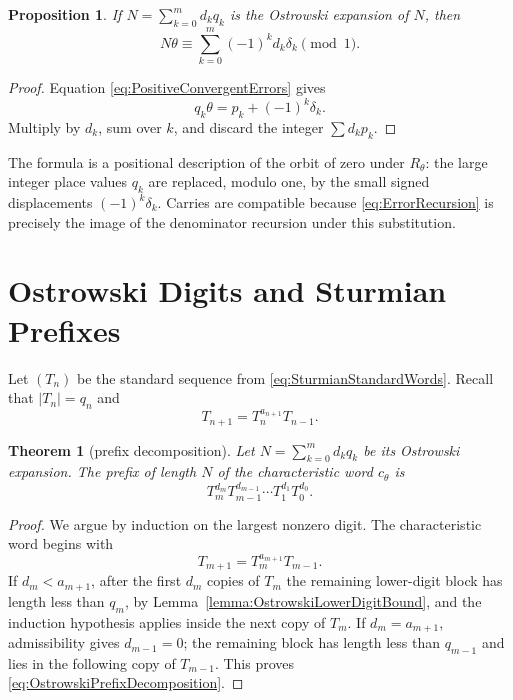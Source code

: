 \documentclass{book}
\newtheorem{proposition}[definition]{Proposition}
\newtheorem{theorem}[definition]{Theorem}
\begin{document}
\begin{proposition}\label{proposition:OstrowskiOrbitFormula}
  If \(N=\sum_{k=0}^m d_kq_k\) is the Ostrowski expansion of \(N\), then
  \begin{equation}\label{eq:OstrowskiOrbitFormula}
    N\theta
    \equiv\sum_{k=0}^m(-1)^kd_k\delta_k\pmod1.
  \end{equation}
\end{proposition}
\begin{proof}
  Equation \eqref{eq:PositiveConvergentErrors} gives
  \[
    q_k\theta=p_k+(-1)^k\delta_k.
  \]
  Multiply by \(d_k\), sum over \(k\), and discard the integer
  \(\sum d_kp_k\).
\end{proof}

The formula is a positional description of the orbit of zero under
\(R_\theta\): the large integer place values \(q_k\) are replaced, modulo
one, by the small signed displacements \((-1)^k\delta_k\).  Carries are
compatible because \eqref{eq:ErrorRecursion} is precisely the image of the
denominator recursion under this substitution.

\section{Ostrowski Digits and Sturmian Prefixes}

Let \((T_n)\) be the standard sequence from
\eqref{eq:SturmianStandardWords}.  Recall that \(|T_n|=q_n\) and
\[
  T_{n+1}=T_n^{a_{n+1}}T_{n-1}.
\]

\begin{theorem}[prefix decomposition]
  \label{theorem:OstrowskiPrefixDecomposition}
  Let \(N=\sum_{k=0}^m d_kq_k\) be its Ostrowski expansion.  The prefix of
  length \(N\) of the characteristic word \(c_\theta\) is
  \begin{equation}\label{eq:OstrowskiPrefixDecomposition}
    T_m^{d_m}T_{m-1}^{d_{m-1}}\cdots T_1^{d_1}T_0^{d_0}.
  \end{equation}
\end{theorem}
\begin{proof}
  We argue by induction on the largest nonzero digit.  The characteristic
  word begins with
  \[
    T_{m+1}=T_m^{a_{m+1}}T_{m-1}.
  \]
  If \(d_m<a_{m+1}\), after the first \(d_m\) copies of \(T_m\) the
  remaining lower-digit block has length less than \(q_m\), by
  Lemma~\ref{lemma:OstrowskiLowerDigitBound}, and the induction hypothesis
  applies inside the next copy of \(T_m\).  If
  \(d_m=a_{m+1}\), admissibility gives \(d_{m-1}=0\); the remaining block
  has length less than \(q_{m-1}\) and lies in the following copy of
  \(T_{m-1}\).  This proves \eqref{eq:OstrowskiPrefixDecomposition}.
\end{proof}
\end{document}
